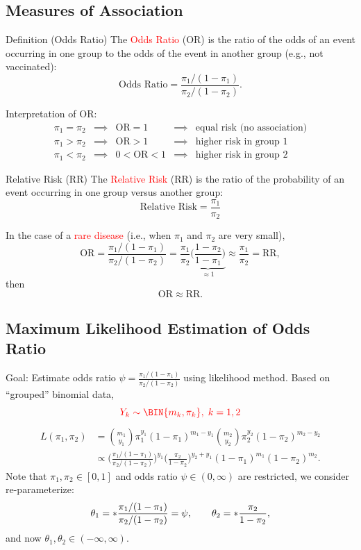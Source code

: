 \documentclass{article}\usepackage[]{graphicx}\usepackage[svgnames]{xcolor}
\let\log\relax%
\newcommand{\OR}{\text{OR}}%
\newcommand{\RR}{\text{RR}}%
\begin{document}
\subsection*{Measures of Association}
\begin{Regular}{Definition (Odds Ratio)}
    The \textcolor{Red}{Odds Ratio} (OR) is the ratio of the odds of an event occurring in one
    group to the odds of the event in another group (e.g., not vaccinated):
    \[ \text{Odds Ratio}=\frac{\pi_1/(1-\pi_1)}{\pi_2/(1-\pi_2)}. \]
\end{Regular}
Interpretation of OR:
\[ \begin{array}{ccccc}
        \pi_1=\pi_2 & \implies & \OR=1   & \implies & \text{equal risk (no association)} \\
        \pi_1>\pi_2 & \implies & \OR>1   & \implies & \text{higher risk in group 1}      \\
        \pi_1<\pi_2 & \implies & 0<\OR<1 & \implies & \text{higher risk in group 2}
    \end{array} \]
\begin{Regular}{Relative Risk (RR)}
    The \textcolor{Red}{Relative Risk} (RR) is the ratio of the probability of an event occurring in one group versus another group:
    \[ \text{Relative Risk}=\frac{\pi_1}{\pi_2} \]
\end{Regular}
In the case of a \textcolor{Red}{rare disease} (i.e., when $ \pi_1 $ and $ \pi_2 $ are very small),
\[ \OR=\frac{\pi_1/(1-\pi_1)}{\pi_2/(1-\pi_2)}=\frac{\pi_1}{\pi_2}\underbrace{\biggl(\frac{1-\pi_2}{1-\pi_1}\biggr)}_{\approx 1}\approx \frac{\pi_1}{\pi_2} =\RR,  \]
then
\[ \OR\approx\RR. \]
\subsection*{Maximum Likelihood Estimation of Odds Ratio}
Goal: Estimate odds ratio $ \psi=\frac{\pi_1/(1-\pi_1)}{\pi_2/(1-\pi_2)} $ using likelihood method. Based
on ``grouped'' binomial data,
\[ \textcolor{Red}{Y_k \sim \BIN{m_k,\pi_k},\; k=1,2} \]
\begin{align*}
    L(\pi_1,\pi_2)
     & =\binom{m_1}{y_1}\pi_1^{y_1}(1-\pi_1)^{m_1-y_1}\binom{m_2}{y_2}\pi_2^{y_2}(1-\pi_2)^{m_2-y_2}                                                        \\
     & \propto\biggl(\frac{\pi_1/(1-\pi_1)}{\pi_2/(1-\pi_2)} \biggr)^{\!y_1}\biggl(\frac{\pi_2}{1-\pi_2}\biggr)^{\! y_2+y_1}(1-\pi_1)^{m_1}(1-\pi_2)^{m_2}.
\end{align*}
Note that $ \pi_1,\pi_2\in[0,1] $ and odds ratio $ \psi\in(0,\infty) $ are restricted, we consider re-parameterize:
\[ \theta_1=\log*{\frac{\pi_1/(1-\pi_1)}{\pi_2/(1-\pi_2)}}=\log{\psi},\qquad \theta_2=\log*{\frac{\pi_2}{1-\pi_2}}, \]
and now $ \theta_1,\theta_2\in(-\infty,\infty) $.
\end{document}
